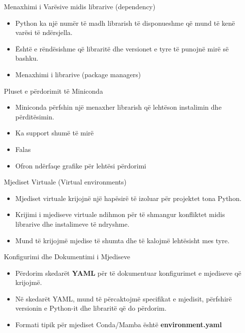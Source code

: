 \documentclass[
  ignorenonframetext,
]{beamer}
\begin{document}
\begin{frame}{Menaxhimi i Varësive midis librarive (dependency)}
\protect\hypertarget{menaxhimi-i-varuxebsive-midis-librarive-dependency}{}
\begin{itemize}
\item
  Python ka një numër të madh librarish të disponueshme që mund të kenë
  varësi të ndërsjella.
\item
  Është e rëndësishme që libraritë dhe versionet e tyre të punojnë mirë
  së bashku.
\item
  Menaxhimi i librarive (package managers)
\end{itemize}
\end{frame}

\begin{frame}{Pluset e përdorimit të Miniconda}
\protect\hypertarget{pluset-e-puxebrdorimit-tuxeb-miniconda}{}
\begin{itemize}
\item
  Miniconda përfshin një menaxher librarish që lehtëson instalimin dhe
  përditësimin.
\item
  Ka support shumë të mirë
\item
  Falas
\item
  Ofron ndërfaqe grafike për lehtësi përdorimi
\end{itemize}
\end{frame}

\begin{frame}{Mjediset Virtuale (Virtual environments)}
\protect\hypertarget{mjediset-virtuale-virtual-environments}{}
\begin{itemize}
\item
  Mjediset virtuale krijojnë një hapësirë të izoluar për projektet tona
  Python.
\item
  Krijimi i mjediseve virtuale ndihmon për të shmangur konfliktet midis
  librarive dhe instalimeve të ndryshme.
\item
  Mund të krijojmë mjedise të shumta dhe të kalojmë lehtësisht mes tyre.
\end{itemize}
\end{frame}

\begin{frame}{Konfigurimi dhe Dokumentimi i Mjediseve}
\protect\hypertarget{konfigurimi-dhe-dokumentimi-i-mjediseve}{}
\begin{itemize}
\item
  Përdorim skedarët \textbf{YAML} për të dokumentuar konfigurimet e
  mjediseve që krijojmë.
\item
  Në skedarët YAML, mund të përcaktojmë specifikat e mjedisit, përfshirë
  versionin e Python-it dhe libraritë që do përdorim.
\item
  Formati tipik për mjediset Conda/Mamba është \textbf{environment.yaml}
\end{itemize}
\end{frame}
\end{document}
